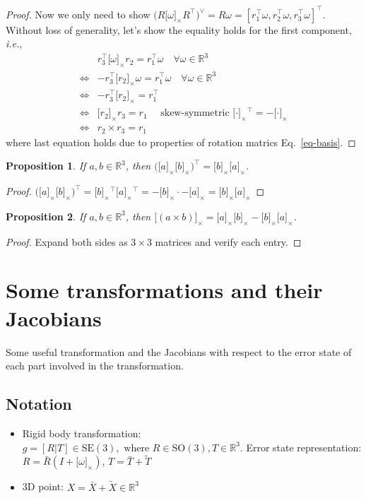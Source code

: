 \documentclass[letter,10pt]{article}
\newcommand{\SE}[1]{ \mathrm{SE(#1)} }
\newcommand{\SO}[1]{ \mathrm{SO(#1)} }
\newcommand{\real}{\mathbb{R}}
\newcommand{\asym}[1]{{\lbrack #1\rbrack}_\times{}}
\newtheorem{prop}{Proposition}[section]
\begin{document}
\begin{proof}
Now we only need to show $\big(R\asym\omega R^\top\big)^\vee=R\omega=[r_1^\top \omega, r_2^\top \omega, r_3^\top \omega]^\top$. Without loss of generality, let's show the equality holds for the first component, \textit{i.e.}, 
\begin{equation}
\begin{aligned}
& r_3^\top\asym\omega r_2 = r_1^\top\omega \quad \forall \omega \in \real^3\\
\Leftrightarrow  & -r_3^\top \asym{r_2} \omega = r_1^\top \omega \quad \forall \omega \in \real^3 \\
\Leftrightarrow & -r_3^\top \asym{r_2} = r_1^\top \\
\Leftrightarrow & \asym{r_2} r_3 = r_1 \quad \text{ skew-symmetric } \asym\cdot^\top=-\asym\cdot\\
\Leftrightarrow & r_2 \times r_3 = r_1
\end{aligned}
\end{equation}
where last equation holds due to properties of rotation matrics Eq.~\eqref{eq-basis}.
\end{proof}

\begin{prop}
If $a, b\in\real^3$, then $\big(\asym{a}\asym{b}\big)^\top=\asym{b}\asym{a}$.
\end{prop}

\begin{proof}
$\big(\asym{a}\asym{b}\big)^\top=\asym{b}^\top\asym{a}^\top=-\asym{b}\cdot -\asym{a}=\asym{b}\asym{a}$
\end{proof}

\begin{prop}
If $a, b\in\real^3$, then $\asym{(a\times b)} = \asym{a}\asym{b} - \asym{b}\asym{a}$.
\end{prop}
\begin{proof}
    Expand both sides as $3\times 3$ matrices and verify each entry.
\end{proof}

\section{Some transformations and their Jacobians}

Some useful transformation and the Jacobians with respect to the error state of each part involved in the transformation. 

\subsection{Notation}
\begin{itemize}
    \item Rigid body transformation: $g=[R|T]\in\SE{3}, \text{ where } R\in\SO{3}, T\in\real^3$. Error state representation: $R=\bar R(I+\asym{\omega})$, $T=\bar T + \tilde T$
    \item 3D point: $X=\bar X + \tilde X \in \real^3$
\end{itemize}
\end{document}
